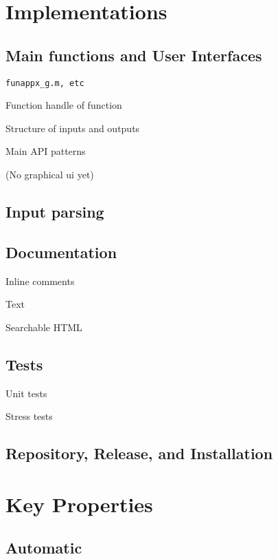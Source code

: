 \documentclass[acmtoms]{doc_acmtrans2m}
\begin{document}
\section{Implementations} 
\label{sec:impl}


\subsection{Main functions and User Interfaces} \label{sec:ui}  
 
 \texttt{funappx\_g.m, etc}
 
 Function handle of function
 
 Structure of inputs and outputs
 
 Main API patterns
 
 (No graphical ui yet)
 
\subsection{Input parsing} 
  

\subsection{Documentation} \label{sec:doc}
  
  Inline comments
  
  Text
  
  Searchable HTML

\subsection{Tests} \label{sec:tests}  
 

Unit tests

Stress tests
 

\subsection{Repository, Release, and Installation} 
 

\section{Key Properties}\label{sec:prop}
\subsection{Automatic}
\end{document}
